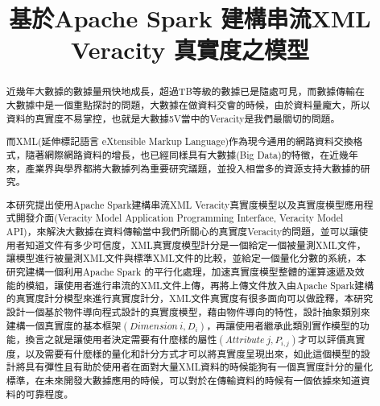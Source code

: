 \documentclass[a4paper]{article}
\title{基於Apache Spark 建構串流XML Veracity 真實度之模型}
\date{}
\begin{document}
\maketitle
\renewcommand{\abstractname}{中文摘要}
\begin{abstract}
近幾年大數據的數據量飛快地成長，超過TB等級的數據已是隨處可見，而數據傳輸在大數據中是一個重點探討的問題，大數據在做資料交會的時候，由於資料量龐大，所以資料的真實度不易掌控，也就是大數據5V當中的Veracity是我們最關切的問題。\\\par
而XML(延伸標記語言 eXtensible Markup Language)作為現今通用的網路資料交換格式，隨著網際網路資料的增長，也已經同樣具有大數據(Big Data)的特徵，在近幾年來，產業界與學界都將大數據列為重要研究議題，並投入相當多的資源支持大數據的研究。\\\par
本研究提出使用Apache Spark建構串流XML Veracity真實度模型以及真實度模型應用程式開發介面(Veracity Model Application Programming Interface, Veracity Model API)，來解決大數據在資料傳輸當中我們所關心的真實度Veracity的問題，並可以讓使用者知道文件有多少可信度，XML真實度模型計分是一個給定一個被量測XML文件，讓模型進行被量測XML文件與標準XML文件的比較，並給定一個量化分數的系統，本研究建構一個利用Apache Spark 的平行化處理，加速真實度模型整體的運算速遞及效能的模組，讓使用者進行串流的XML文件上傳，再將上傳文件放入由Apache Spark建構的真實度計分模型來進行真實度計分，XML文件真實度有很多面向可以做詮釋，本研究設計一個基於物件導向程式設計的真實度模型，藉由物件導向的特性，設計抽象類別來建構一個真實度的基本框架$(Dimension\ i, D_i)$，再讓使用者繼承此類別實作模型的功能，換言之就是讓使用者決定需要有什麼樣的屬性$(Attribute\ j, P_{i, j})$才可以評價真實度，以及需要有什麼樣的量化和計分方式才可以將真實度呈現出來，如此這個模型的設計將具有彈性且有助於使用者在面對大量XML資料的時候能狗有一個真實度計分的量化標準，在未來開發大數據應用的時候，可以對於在傳輸資料的時候有一個依據來知道資料的可靠程度。
\end{abstract}
\newpage
\tableofcontents
\newpage
\listoffigures
\newpage

\newpage

\newpage

\newpage

\end{document}
